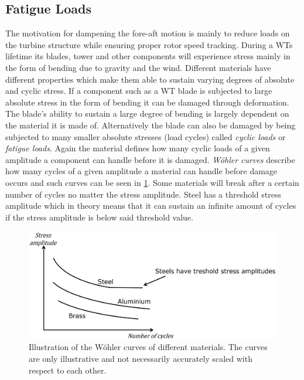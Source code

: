 \subsection{Fatigue Loads}
The motivation for dampening the fore-aft motion is mainly to reduce loads on the turbine structure while ensuring proper rotor speed tracking. During a WTs lifetime its blades, tower and other components will experience stress mainly in the form of bending due to gravity and the wind. Different materials have different properties which make them able to sustain varying degrees of absolute and cyclic stress. If a component such as a WT blade is subjected to large absolute stress in the form of bending it can be damaged through deformation. The blade's ability to sustain a large degree of bending is largely dependent on the material it is made of. Alternatively the blade can also be damaged by being subjected to many smaller absolute stresses (load cycles) called \textit{cyclic loads} or \textit{fatigue loads}. Again the material defines how many cyclic loads of a given amplitude a component can handle before it is damaged. \textit{Wöhler curves} describe how many cycles of a given amplitude a material can handle before damage occurs and such curves can be seen in \cref{fig:woher_curve}. Some materials will break after a certain number of cycles no matter the stress amplitude. Steel has a threshold stress amplitude which in theory means that it can sustain an infinite amount of cycles if the stress amplitude is below said threshold value.

\begin{figure}[ht]
	\centering
	\includegraphics[width=0.6\linewidth]{Graphics/WohlerCurve.png}
	\caption{Illustration of the Wöhler curves of different materials. The curves are only illustrative and not necessarily accurately scaled with respect to each other.}
	\label{fig:woher_curve}
\end{figure}

